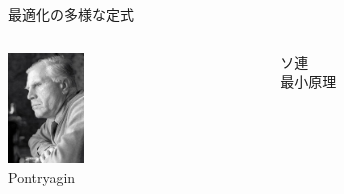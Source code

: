 \documentclass[twocolumn, dvipdfmx,12pt]{beamer}
\begin{document}
\begin{frame}{最適化の多様な定式}
\begin{columns}
            \begin{column}{0.5\textwidth}
                \begin{boxnote}
                    \begin{columns}
                        \begin{column}{.5\textwidth}
                            \includegraphics[clip, width = 2.0cm]{Pontryagin.png}\\
                            {\tiny Pontryagin}
                            \centering
                        \end{column}
                        \begin{column}{.5\textwidth}
                            ソ連\\
                            \vspace{2em}
                            最小原理 \\
                        \end{column}
                    \end{columns}
                \end{boxnote}
            \end{column}
        \end{columns}

    \end{frame}
\end{document}
